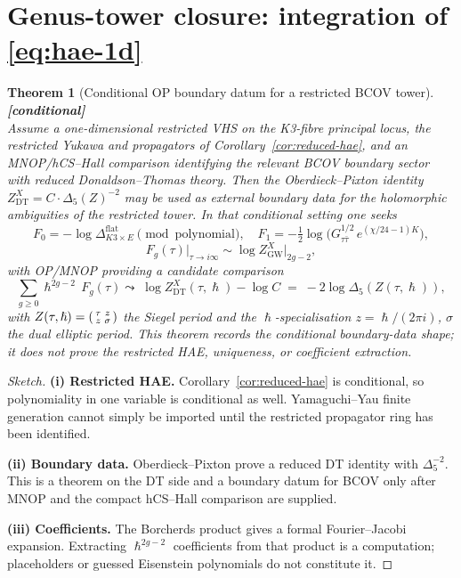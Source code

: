 \documentclass[11pt]{article}
\theoremstyle{plain}
\newtheorem{theorem}{Theorem}[section]
\theoremstyle{definition}
\theoremstyle{remark}
\providecommand{\hbar}{\hslash}
\providecommand{\Disc}{\Delta}
\providecommand{\ClaimStatusConditional}[1][]{\textbf{[conditional]}}
\begin{document}
\section{Genus-tower closure: integration of \eqref{eq:hae-1d}}
\label{sec:integration}

\begin{theorem}[Conditional OP boundary datum for a restricted BCOV tower]
\label{thm:bcov-closure}
\ClaimStatusConditional{}\\
Assume a one-dimensional restricted VHS on the K3-fibre principal locus,
the restricted Yukawa and propagators of
Corollary~\ref{cor:reduced-hae}, and an MNOP/hCS--Hall comparison
identifying the relevant BCOV boundary sector with reduced
Donaldson--Thomas theory. Then the Oberdieck--Pixton identity
$Z^X_{\mathrm{DT}} = C\cdot\Delta_5(Z)^{-2}$ may be used as external
boundary data for the holomorphic ambiguities of the restricted tower.
In that conditional setting one seeks
\[
F_0 = -\log\Disc_{K3\times E}^{\mathrm{flat}} \pmod{\text{polynomial}},
\quad F_1 = -\tfrac{1}{2}\log\bigl(G^{1/2}_{\tau\bar\tau}\,
e^{(\chi/24 - 1)K}\bigr),
\]
\[
F_g(\tau)\bigr|_{\tau\to i\infty} \sim \log Z^X_{\mathrm{GW}}\bigr|_{2g-2},
\]
with OP/MNOP providing a candidate comparison
\[
\sum_{g\ge 0} \hbar^{2g-2}\, F_g(\tau)
\leadsto\; \log Z^X_{\mathrm{DT}}(\tau,\hbar) - \log C
\;=\; -2\log \Delta_5(Z(\tau,\hbar)),
\]
with $Z(\tau, \hbar) = \begin{psmallmatrix}\tau & z\\ z &
\sigma\end{psmallmatrix}$ the Siegel period and the
$\hbar$-specialisation $z = \hbar/(2\pi i)$, $\sigma$ the dual
elliptic period. This theorem records the conditional boundary-data
shape; it does not prove the restricted HAE, uniqueness, or coefficient
extraction.
\end{theorem}

\begin{proof}[Sketch]
\textbf{(i) Restricted HAE.} Corollary~\ref{cor:reduced-hae} is
conditional, so polynomiality in one variable is conditional as well.
Yamaguchi--Yau finite generation cannot simply be imported until the
restricted propagator ring has been identified.

\textbf{(ii) Boundary data.} Oberdieck--Pixton prove a reduced DT
identity with $\Delta_5^{-2}$. This is a theorem on the DT side and a
boundary datum for BCOV only after MNOP and the compact hCS--Hall
comparison are supplied.

\textbf{(iii) Coefficients.} The Borcherds product gives a formal
Fourier--Jacobi expansion. Extracting $\hbar^{2g-2}$ coefficients from
that product is a computation; placeholders or guessed Eisenstein
polynomials do not constitute it.
\end{proof}
\end{document}
